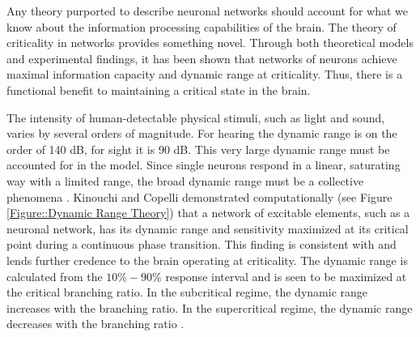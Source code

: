 \documentclass[12pt]{article}
\begin{document}
Any theory purported to describe neuronal networks should account for what we know about the information processing capabilities of the brain. The theory of criticality in networks provides something novel. Through both theoretical models and experimental findings, it has been shown that networks of neurons achieve maximal information capacity and dynamic range at criticality. Thus, there is a functional benefit to maintaining a critical state in the brain.
   
The intensity of human-detectable physical stimuli, such as light and sound, varies by several orders of magnitude. For hearing the dynamic range is on the order of 140 dB, for sight it is 90 dB. This very large dynamic range must be accounted for in the model. Since single neurons respond in a linear, saturating way with a limited range, the broad dynamic range must be a collective phenomena \cite{Kinouchi2006b}. Kinouchi and Copelli demonstrated computationally (see Figure \ref{Figure::Dynamic Range Theory}) that a network of excitable elements, such as a neuronal network, has its dynamic range and sensitivity maximized at its critical point during a continuous phase transition\cite{Kinouchi2006b}. This finding is consistent with and lends further credence to the brain operating at criticality. The dynamic range is calculated from the $10\%-90\%$ response interval and is seen to be maximized at the critical branching ratio. In the subcritical regime, the dynamic range increases with the branching ratio. In the supercritical regime, the dynamic range decreases with the branching ratio \cite{Larremore2011a, Larremore2012a}.
\end{document}
